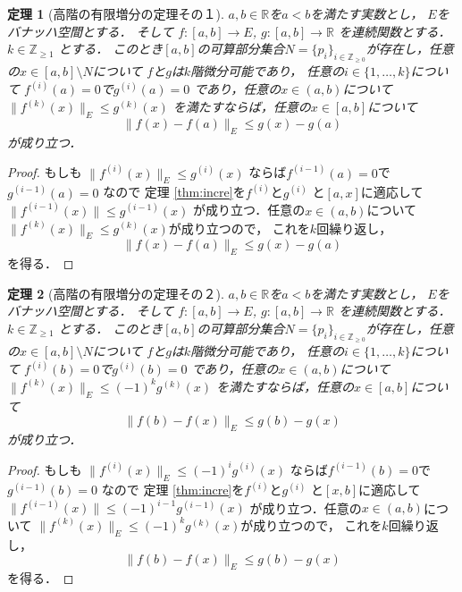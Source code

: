 \documentclass[leqno, a4paper, 12pt]{jsarticle}
\newtheorem{thm}{定理}
\newcommand{\zz}{\mathbb{Z}}
\newcommand{\rr}{\mathbb{R}}
\newcommand{\bbb}[2]{#1^{(#2)}}
\begin{document}
\begin{thm}[高階の有限増分の定理その１]\label{thm:increkokai}
$a, b\in \rr$を$a<b$を満たす実数とし，
$E$をバナッハ空間とする．
そして
$f: [a, b]\to E$, 
$g: [a, b]\to \rr$
を連続関数とする．
$k\in \zz_{\ge 1}$
とする．
このとき$[a, b]$の可算部分集合$N=\{p_{i}\}_{i\in \zz_{\ge 0}}$が存在し，任意の$x\in [a, b]\setminus N$について
$f$と$g$は$k$階微分可能であり，
任意の$i\in \{1, \dots, k\}$について
$\bbb{f}{i}(a)=0$で$\bbb{g}{i}(a)=0$
であり，任意の$x\in (a, b)$について
$\|\bbb{f}{k}(x)\|_{E}\le \bbb{g}{k}(x)$
を満たすならば，任意の$x\in [a, b]$について
\[
\|f(x)-f(a)\|_{E}\le g(x)-g(a)
\]
が成り立つ．
\end{thm}
\begin{proof}
もしも
$\|\bbb{f}{i}(x)\|_{E}\le \bbb{g}{i}(x)$
ならば$\bbb{f}{i-1}(a)=0$で$\bbb{g}{i-1}(a)=0$
なので
定理 \ref{thm:incre}を$\bbb{f}{i}$と$\bbb{g}{i}$
と$[a, x]$に適応して
$\|\bbb{f}{i-1}(x)\|\le \bbb{g}{i-1}(x)$
が成り立つ．任意の$x\in (a, b)$について
$\|\bbb{f}{k}(x)\|_{E}\le \bbb{g}{k}(x)$が成り立つので，
これを$k$回繰り返し，
\[
\|f(x)-f(a)\|_{E}\le g(x)-g(a)
\]
を得る．
\end{proof}

\begin{thm}[高階の有限増分の定理その２]\label{thm:increkokai2}
$a, b\in \rr$を$a<b$を満たす実数とし，
$E$をバナッハ空間とする．
そして
$f: [a, b]\to E$, 
$g: [a, b]\to \rr$
を連続関数とする．
$k\in \zz_{\ge 1}$
とする．
このとき$[a, b]$の可算部分集合$N=\{p_{i}\}_{i\in \zz_{\ge 0}}$が存在し，任意の$x\in [a, b]\setminus N$について
$f$と$g$は$k$階微分可能であり，
任意の$i\in \{1, \dots, k\}$について
$\bbb{f}{i}(b)=0$で$\bbb{g}{i}(b)=0$
であり，任意の$x\in (a, b)$について
$\|\bbb{f}{k}(x)\|_{E}\le (-1)^k\bbb{g}{k}(x)$
を満たすならば，任意の$x\in [a, b]$について
\[
\|f(b)-f(x)\|_{E}\le g(b)-g(x)
\]
が成り立つ．
\end{thm}
\begin{proof}
もしも
$\|\bbb{f}{i}(x)\|_{E}\le (-1)^{i}\bbb{g}{i}(x)$
ならば$\bbb{f}{i-1}(b)=0$で$\bbb{g}{i-1}(b)=0$
なので
定理 \ref{thm:incre}を$\bbb{f}{i}$と$\bbb{g}{i}$
と$[x, b]$に適応して
$\|\bbb{f}{i-1}(x)\|\le(-1)^{i-1} \bbb{g}{i-1}(x)$
が成り立つ．任意の$x\in (a, b)$について
$\|\bbb{f}{k}(x)\|_{E}\le (-1)^{k}\bbb{g}{k}(x)$が成り立つので，
これを$k$回繰り返し，
\[
\|f(b)-f(x)\|_{E}\le g(b)-g(x)
\]
を得る．
\end{proof}
\end{document}
